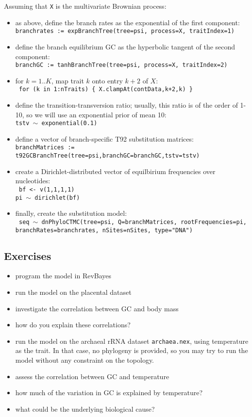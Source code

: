 \documentclass[usletter]{article}
\newcommand{\cmd}[1]{\texttt{#1}}
\begin{document}
Assuming that \cmd{X} is the multivariate Brownian process:
\begin{itemize}
\item
as above, define the branch rates as the exponential of the first component:
\\
\cmd{branchrates := expBranchTree(tree=psi, process=X, traitIndex=1)}
\item
define the branch equilibrium GC as the hyperbolic tangent of the second component:
\\
\cmd{branchGC := tanhBranchTree(tree=psi, process=X, traitIndex=2)}
\item
for $k=1..K$, map trait $k$ onto entry $k+2$ of $X$:
\\
\cmd{
for (k in 1:nTraits)    \{
        X.clampAt(contData,k+2,k)
\}
}
\item
define the transition-transversion ratio; usually, this ratio is of the order of 1-10, so we will use an exponential prior of mean 10:
\\
\cmd{tstv $\sim$ exponential(0.1)}
\item
define a vector of branch-specific T92 substitution matrices:
\\
\cmd{branchMatrices := t92GCBranchTree(tree=psi,branchGC=branchGC,tstv=tstv)}
\item
create a Dirichlet-distributed vector of equilbirium frequencies over nucleotides:
\\
\cmd{
bf <- v(1,1,1,1)
\\
pi $\sim$ dirichlet(bf)
}
\item
finally, create the substitution model:
\\
\cmd{
seq $\sim$ dnPhyloCTMC(tree=psi, Q=branchMatrices, rootFrequencies=pi,
\\
branchRates=branchrates, nSites=nSites, type="DNA")
}
\end{itemize}

\subsection*{Exercises}

\begin{itemize}
\item
program the model in RevBayes
\item
run the model on the placental dataset
\item
investigate the correlation between GC and body mass
\item
how do you explain these correlations?
\item
run the model on the archaeal rRNA dataset \cmd{archaea.nex}, using temperature as the trait. In that case, no phylogeny is provided, so you may try to run the model without any constraint on the topology.
\item
assess the correlation between GC and temperature
\item
how much of the variation in GC is explained by temperature?
\item
what could be the underlying biological cause?
\end{itemize}
\end{document}
